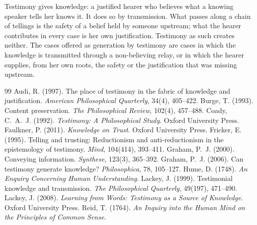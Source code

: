 \documentclass{situationist-preprint}
\begin{document}
Testimony gives knowledge: a justified hearer who believes what a knowing speaker tells her knows it. It does so by transmission. What passes along a chain of tellings is the safety of a belief held by someone upstream; what the hearer contributes in every case is her own justification. Testimony as such creates neither. The cases offered as generation by testimony are cases in which the knowledge is transmitted through a non-believing relay, or in which the hearer supplies, from her own roots, the safety or the justification that was missing upstream.

\begin{thebibliography}{99}\small
{} Audi, R. (1997). The place of testimony in the fabric of knowledge and justification. \emph{American Philosophical Quarterly}, 34(4), 405--422.
 Burge, T. (1993). Content preservation. \emph{The Philosophical Review}, 102(4), 457--488.
 Coady, C.~A.~J. (1992). \emph{Testimony: A Philosophical Study}. Oxford University Press.
 Faulkner, P. (2011). \emph{Knowledge on Trust}. Oxford University Press.
 Fricker, E. (1995). Telling and trusting: Reductionism and anti-reductionism in the epistemology of testimony. \emph{Mind}, 104(414), 393--411.
 Graham, P.~J. (2000). Conveying information. \emph{Synthese}, 123(3), 365--392.
 Graham, P.~J. (2006). Can testimony generate knowledge? \emph{Philosophica}, 78, 105--127.
 Hume, D. (1748). \emph{An Enquiry Concerning Human Understanding}.
 Lackey, J. (1999). Testimonial knowledge and transmission. \emph{The Philosophical Quarterly}, 49(197), 471--490.
 Lackey, J. (2008). \emph{Learning from Words: Testimony as a Source of Knowledge}. Oxford University Press.
 Reid, T. (1764). \emph{An Inquiry into the Human Mind on the Principles of Common Sense}.
\end{thebibliography}
\end{document}
